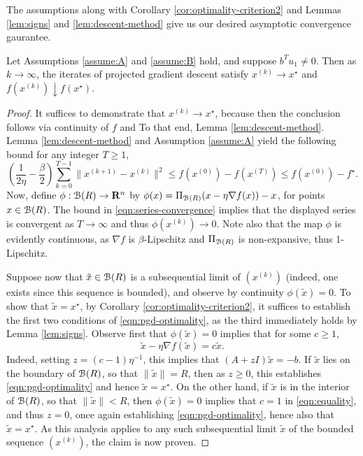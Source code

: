 \documentclass[11pt]{article}
\newcommand{\proj}{\ensuremath{\Pi_{\B(R)}}}
\begin{document}
The assumptions along with Corollary \ref{cor:optimality-criterion2}
and Lemmas \ref{lem:signs} and \ref{lem:descent-method}
give us our desired asymptotic convergence gaurantee.
\begin{prop}\label{prop:pgd-convergence}
Let Assumptions \ref{assume:A} and 
\ref{assume:B} 
hold, and suppose $b^Tu_1 \neq 0$.
Then as $k \to \infty$, the iterates
of projected gradient descent satisfy $x^{(k)} \to x^\star$
and $f(x^{(k)}) \downarrow f(x^\star)$.
\end{prop}
\begin{proof}
  It suffices to demonstrate that $x^{(k)} \to x^\star$, because then
  the conclusion follows via continuity of $f$ and
  To that end, Lemma \ref{lem:descent-method}.
Lemma \ref{lem:descent-method} and 
Assumption \ref{assume:A} yield the following bound for any integer $T \geq 1$, 
\begin{equation}
\label{eqn:series-convergence}
\left(\frac{1}{2\eta} - \frac{\beta}{2} \right)\sum_{k=0}^{T - 1} 
\|x^{(k + 1)} - x^{(k)}\|^2 
\leq f(x^{(0)}) - f(x^{(T)}) 
\leq f(x^{(0)}) - f^\star. 
\end{equation}
Now, define $\phi: \mathcal{B}(R) \to \mathbf{R}^n$ 
by $\phi(x) = \proj(x - \eta \nabla f(x)) - x$, for points $x \in \mathcal{B}(R)$. 
The bound in \eqref{eqn:series-convergence} implies that the displayed series is convergent as $T \to \infty$ and thus 
$\phi(x^{(k)}) \to 0$.
Note also that the map $\phi$ is evidently continuous, as $\nabla f$ is $\beta$-Lipschitz and $\proj$ is 
non-expansive, thus 1-Lipschitz. 

Suppose now that $\tilde x \in \mathcal{B}(R)$ is a subsequential 
limit of $(x^{(k)})$ (indeed, one exists since this sequence is bounded), and observe by
continuity $\phi(\tilde x) = 0$. To show that $\tilde x = x^\star$, by Corollary \ref{cor:optimality-criterion2}, it
suffices to establish the first two conditions of \eqref{eqn:pgd-optimality}, as the third immediately holds by
Lemma \ref{lem:signs}. Observe first that $\phi(\tilde x) = 0$ implies that for some $c \geq 1$,
\begin{equation}\label{eqn:equality}
\tilde x - \eta \nabla f(\tilde x) = c \tilde x.
\end{equation}
Indeed, setting $z = (c - 1)\eta^{-1}$, this implies that $(A + zI)\tilde x = -b$. 
If $\tilde x$ lies on the boundary of $\mathcal{B}(R)$, so that $\|\tilde x\| = R$, then as $z \geq 0$,
this establishes \eqref{eqn:pgd-optimality} and hence $\tilde x = x^\star$. On the other hand,
if $\tilde x$ is in the interior of $\mathcal{B}(R)$, so that $\|\tilde x\| < R$, then
$\phi(\tilde x) = 0$ implies that $c = 1$ in \eqref{eqn:equality}, and thus $z = 0$, once again
establishing \eqref{eqn:pgd-optimality}, hence also that $\tilde x = x^\star$. As this analysis applies
to any such subsequential limit $\tilde x$ of the bounded sequence $(x^{(k)})$, the claim is now proven.
\end{proof}
\end{document}
